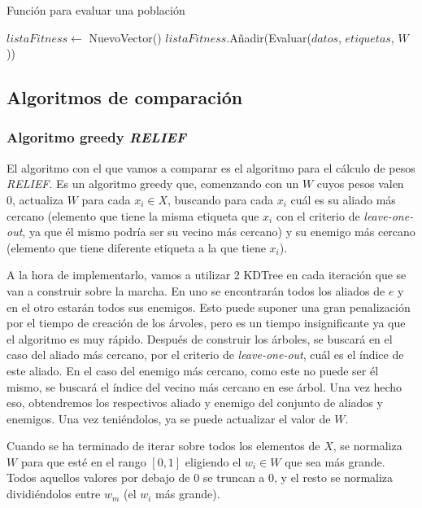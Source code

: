 \documentclass[11pt,a4paper]{article}
\begin{document}
\begin{algorithm}[H]
\caption{Función para evaluar una población}
\begin{algorithmic}[1]
\State $listaFitness \gets $ NuevoVector()
	\State $listaFitness$.Añadir(Evaluar($datos$, $etiquetas$, $W$))
\EndFor
\State {}
\EndFunction
\end{algorithmic}
\end{algorithm}

\subsection{Algoritmos de comparación}

\subsubsection{Algoritmo greedy \textit{RELIEF}}

El algoritmo con el que vamos a comparar es el algoritmo para el cálculo de pesos \textit{RELIEF}. Es un algoritmo
greedy que, comenzando con un $W$ cuyos pesos valen 0, actualiza $W$ para cada $x_i \in X$, buscando para cada $x_i$ cuál es
su aliado más cercano (elemento que tiene la misma etiqueta que $x_i$ con el criterio de \textit{leave-one-out}, ya que él
mismo podría ser su vecino más cercano) y su enemigo más cercano (elemento que tiene diferente etiqueta a la que tiene $x_i$).

A la hora de implementarlo, vamos a utilizar 2 KDTree en cada iteración que se van a construir sobre la marcha. En uno se
encontrarán todos los aliados de $e$ y en el otro estarán todos sus enemigos. Esto puede suponer una gran penalización por el
tiempo de creación de los árvoles, pero es un tiempo insignificante ya que el algoritmo es muy rápido. Después de construir los
árboles, se buscará en el caso del aliado más cercano, por el criterio de \textit{leave-one-out}, cuál es el índice de este
aliado. En el caso del enemigo más cercano, como este no puede ser él mismo, se buscará el índice del vecino más cercano en ese
árbol. Una vez hecho eso, obtendremos los respectivos aliado y enemigo del conjunto de aliados y enemigos. Una vez teniéndolos,
ya se puede actualizar el valor de $W$.

Cuando se ha terminado de iterar sobre todos los elementos de $X$, se normaliza $W$ para que esté en el rango $[0, 1]$ 
eligiendo el $w_i \in W$ que sea más grande. Todos aquellos valores por debajo de 0 se truncan a 0, y el resto se normaliza
dividiéndolos entre $w_m$ (el $w_i$ más grande).
\end{document}
